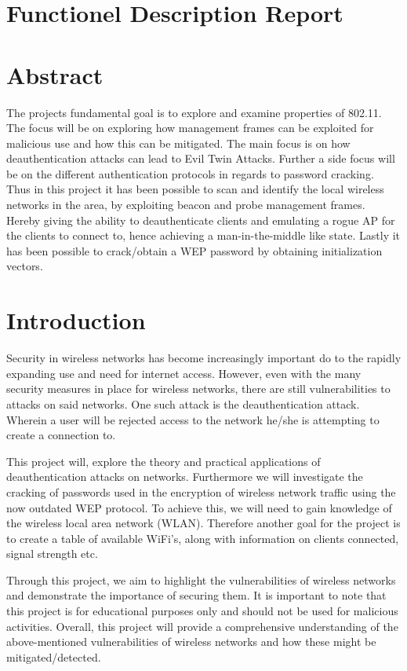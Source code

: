 \section*{Functionel Description Report}
\tableofcontents
\newpage

\section{Abstract}
The projects fundamental goal is to explore and examine properties of 802.11. The focus will be on exploring how management frames can be exploited for malicious use and how this can be mitigated. The main focus is on how deauthentication attacks can lead to Evil Twin Attacks. Further a side focus will be on the different authentication protocols in regards to password cracking. Thus in this project it has been possible to scan and identify the local wireless networks in the area, by exploiting beacon and probe management frames. Hereby giving the ability to deauthenticate clients and emulating a rogue AP for the clients to connect to, hence achieving a man-in-the-middle like state. Lastly it has been possible to crack/obtain a WEP password by obtaining initialization vectors.


\section{Introduction}

Security in wireless networks has become increasingly important do to the rapidly expanding use and need for internet access. However, even with the many security measures in place for wireless networks, there are still vulnerabilities to attacks on said networks. One such attack is the deauthentication attack. Wherein a user will be rejected access to the network he/she is attempting to create a connection to.

This project will, explore the theory and practical applications of deauthentication attacks on networks. Furthermore we will investigate the cracking of passwords used in the encryption of wireless network traffic using the now outdated WEP protocol. To achieve this, we will need to gain knowledge of the wireless local area network (WLAN). Therefore another goal for the project is to create a table of available WiFi's, along with information on clients connected, signal strength etc.

Through this project, we aim to highlight the vulnerabilities of wireless networks and demonstrate the importance of securing them. It is important to note that this project is for educational purposes only and should not be used for malicious activities. Overall, this project will provide a comprehensive understanding of the above-mentioned vulnerabilities of wireless networks and how these might be mitigated/detected.

